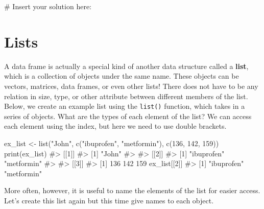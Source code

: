 \documentclass[
  letterpaper,
]{krantz}
\makeatletter
\newenvironment{Shaded}{\begin{snugshade}}{\end{snugshade}}
\newcommand{\CommentTok}[1]{\textcolor[rgb]{0.37,0.37,0.37}{#1}}
\newcommand{\DecValTok}[1]{\textcolor[rgb]{0.68,0.00,0.00}{#1}}
\newcommand{\FunctionTok}[1]{\textcolor[rgb]{0.28,0.35,0.67}{#1}}
\newcommand{\NormalTok}[1]{\textcolor[rgb]{0.00,0.23,0.31}{#1}}
\newcommand{\OtherTok}[1]{\textcolor[rgb]{0.00,0.23,0.31}{#1}}
\newcommand{\StringTok}[1]{\textcolor[rgb]{0.13,0.47,0.30}{#1}}
\newenvironment{kframe}{%
\medskip{}
\setlength{\fboxsep}{.8em}
 \def\at@end@of@kframe{}%
 \ifinner\ifhmode%
  \def\at@end@of@kframe{\end{minipage}}%
  \begin{minipage}{\columnwidth}%
 \fi\fi%
 \def\FrameCommand##1{\hskip\@totalleftmargin \hskip-\fboxsep
 \colorbox{shadecolor}{##1}\hskip-\fboxsep
     \hskip-\linewidth \hskip-\@totalleftmargin \hskip\columnwidth}%
 \MakeFramed {\advance\hsize-\width
   \@totalleftmargin\z@ \linewidth\hsize
   \@setminipage}}%
 {\par\unskip\endMakeFramed%
 \at@end@of@kframe}
\renewenvironment{Shaded}{\begin{kframe}}{\end{kframe}}
\makeatother
\begin{document}
\begin{Shaded}
\begin{Highlighting}[]
\CommentTok{\# Insert your solution here:}
\end{Highlighting}
\end{Shaded}

\section{Lists}\label{lists}

A data frame is actually a special kind of another data structure called
a \textbf{list}, which is a collection of objects under the same name.
These objects can be vectors, matrices, data frames, or even other
lists! There does not have to be any relation in size, type, or other
attribute between different members of the list. Below, we create an
example list using the \texttt{list()} function, which takes in a series
of objects. What are the types of each element of the list? We can
access each element using the index, but here we need to use double
brackets.

\begin{Shaded}
\begin{Highlighting}[]
\NormalTok{ex\_list }\OtherTok{\textless{}{-}} \FunctionTok{list}\NormalTok{(}\StringTok{"John"}\NormalTok{, }\FunctionTok{c}\NormalTok{(}\StringTok{"ibuprofen"}\NormalTok{, }\StringTok{"metformin"}\NormalTok{), }\FunctionTok{c}\NormalTok{(}\DecValTok{136}\NormalTok{, }\DecValTok{142}\NormalTok{, }\DecValTok{159}\NormalTok{))}
\FunctionTok{print}\NormalTok{(ex\_list)}
\CommentTok{\#\textgreater{} [[1]]}
\CommentTok{\#\textgreater{} [1] "John"}
\CommentTok{\#\textgreater{} }
\CommentTok{\#\textgreater{} [[2]]}
\CommentTok{\#\textgreater{} [1] "ibuprofen" "metformin"}
\CommentTok{\#\textgreater{} }
\CommentTok{\#\textgreater{} [[3]]}
\CommentTok{\#\textgreater{} [1] 136 142 159}
\NormalTok{ex\_list[[}\DecValTok{2}\NormalTok{]]}
\CommentTok{\#\textgreater{} [1] "ibuprofen" "metformin"}
\end{Highlighting}
\end{Shaded}

More often, however, it is useful to name the elements of the list for
easier access. Let's create this list again but this time give names to
each object.
\end{document}
